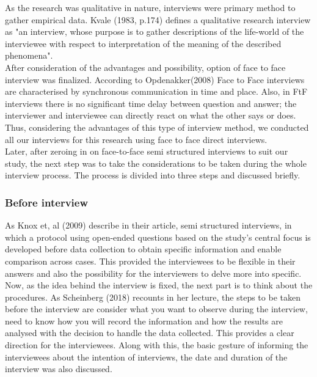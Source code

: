 As the research was qualitative in nature, interviews were primary method to gather empirical data.  Kvale (1983, p.174) defines a qualitative research interview as "an interview, whose purpose is to gather descriptions of the life-world of the interviewee with respect to interpretation of the meaning of the described phenomena". \\ 

After consideration of the advantages and possibility, option of face to face interview was finalized. According to Opdenakker(2008) Face to Face interviews are characterised by synchronous communication in time and place. Also, in FtF interviews there is no significant time delay between question and answer; the interviewer and interviewee can directly react on what the other says or does. Thus, considering the advantages of this type of interview method, we conducted all our interviews for this research using face to face direct interviews.\\

Later, after zeroing in on face-to-face semi structured interviews to suit our study, the next step was to take the considerations to be taken during the whole interview process. The process is divided into three steps and discussed briefly.\\

\subsubsection{Before interview}
As Knox et, al (2009) describe in their article, semi structured interviews, in which a protocol using open-ended questions based on the study’s central focus is developed before data collection to obtain specific information and enable comparison across cases. This provided the interviewees to be flexible in their answers and also the possibility for the interviewers to delve more into specific. Now, as the idea behind the interview is fixed, the next part is to think about the procedures. As Scheinberg (2018) recounts in her lecture, the steps to be taken before the interview are consider what you want to observe during the interview, need to know how you will record the information and how the results are analysed with the decision to handle the data collected. This provides a clear direction for the interviewees. Along with this, the basic gesture of informing the interviewees about the intention of interviews, the date and duration of the interview was also discussed. \\

